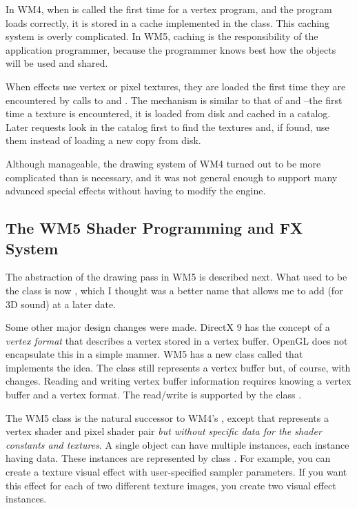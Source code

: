 \documentclass{article}
\begin{document}
In WM4, when  is called the first time for a
vertex program, and the program loads correctly, it is stored in a cache
implemented in the  class.  This caching system is overly
complicated.  In WM5, caching is the responsibility of the application
programmer, because the programmer knows best how the objects will be
used and shared.

When effects use vertex or pixel textures, they are loaded the first time
they are encountered by calls to  and
.  The mechanism is similar to that of
 and --the first time a texture is
encountered, it is loaded from disk and cached in a catalog.  Later
requests look in the catalog first to find the textures and, if found,
use them instead of loading a new copy from disk.

Although manageable, the drawing system of WM4 turned out to be more
complicated than is necessary, and it was not general enough to support
many advanced special effects without having to modify the engine.

\subsection{The WM5 Shader Programming and FX System}
\label{subsec.shaderfx}

The abstraction of the drawing pass in WM5 is described next.  What used
to be the  class is now , which I thought
was a better name that allows me to add  (for 3D sound) at
a later date.

Some other major design changes were made.  DirectX 9 has the concept of
a {\em vertex format} that describes a vertex stored in a vertex buffer.
OpenGL does not encapsulate this in a simple manner.  WM5 has a new class
called  that implements the idea.  The class
 still represents a vertex buffer but, of course, with
changes.  Reading and writing vertex buffer information requires knowing
a vertex buffer and a vertex format.  The read/write is supported by the
class .

The WM5 class  is the natural successor to WM4's
, except that  represents a
vertex shader and pixel shader pair {\em but without specific data for
the shader constants and textures}.  A single  object
can have multiple instances, each instance having data.  These instances
are represented by class .  For example, you
can create a texture visual effect with user-specified sampler parameters.
If you want this effect for each of two different texture images, you
create two visual effect instances.
\end{document}
